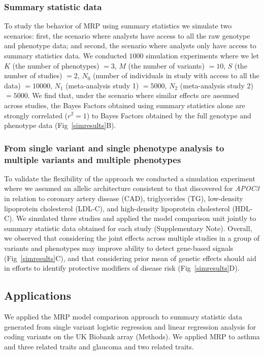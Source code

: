 \subsubsection*{Summary statistic data}
To study the behavior of MRP using summary statistics we simulate two scenarios: first, the scenario where analysts have access to all the raw genotype and phenotype data; and second, the scenario where analysts only have access to summary statistics data\cite{liu2014meta}. We conducted $1000$ simulation experiments where we let $K$ (the number of phenotypes) $=3$, $M$ (the number of variants) $=10$, $S$ (the number of studies) $=2$, $N_0$ (number of individuals in study with access to all the data) $= 10000$, $N_1$ (meta-analysis study 1) $= 5000$, $N_2$ (meta-analysis study 2) $= 5000$. We find that, under the scenario where similar effects are assumed across studies, the Bayes Factors obtained using summary statistics alone are strongly correlated ($r^2 = 1$) to Bayes Factors obtained by the full genotype and phenotype data (Fig~\ref{simresults}B).

\subsubsection*{From single variant and single phenotype analysis to multiple variants and multiple phenotypes}
To validate the flexibility of the approach we conducted a simulation experiment where we assumed an allelic architecture consistent to that discovered for {\it APOC3} in relation to coronary artery disease (CAD), triglycerides (TG), low-density lipoprotein cholesterol (LDL-C), and high-density lipoprotein cholesterol (HDL-C)\cite{apoc3,apoc32,jorgensen2014loss,cohorts2014loss}. We simulated three studies and applied the model comparison unit jointly to summary statistic data obtained for each study (Supplementary Note). Overall, we observed that considering the joint effects across multiple studies in a group of variants and phenotypes may improve ability to detect gene-based signals (Fig~\ref{simresults}C), and that considering prior mean of genetic effects should aid in efforts to identify protective modifiers of disease risk (Fig~\ref{simresults}D).

\subsection*{Applications}
We applied the MRP model comparison approach to summary statistic data generated from single variant logistic regression and linear regression analysis for coding variants on the UK Biobank array (Methods). We applied MRP to asthma and three related traits and glaucoma and two related traits.


